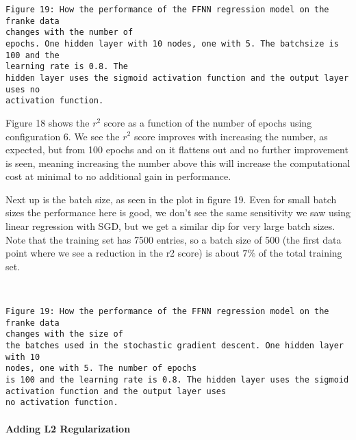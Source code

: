 \documentclass[11pt]{article}
\begin{document}
    \begin{Verbatim}[commandchars=\\\{\}]
Figure 19: How the performance of the FFNN regression model on the franke data
changes with the number of
epochs. One hidden layer with 10 nodes, one with 5. The batchsize is 100 and the
learning rate is 0.8. The
hidden layer uses the sigmoid activation function and the output layer uses no
activation function.
    \end{Verbatim}

    Figure 18 shows the \(r^2\) score as a function of the number of epochs
using configuration 6. We see the \(r^2\) score improves with increasing
the number, as expected, but from 100 epochs and on it flattens out and
no further improvement is seen, meaning increasing the number above this
will increase the computational cost at minimal to no additional gain in
performance.

Next up is the batch size, as seen in the plot in figure 19. Even for
small batch sizes the performance here is good, we don't see the same
sensitivity we saw using linear regression with SGD, but we get a
similar dip for very large batch sizes. Note that the training set has
7500 entries, so a batch size of 500 (the first data point where we see a
reduction in the r2 score) is about \(7\%\) of the total training set.

    \begin{center}
    \end{center}
    { \hspace*{\fill} \\}
    
    \begin{Verbatim}[commandchars=\\\{\}]
Figure 19: How the performance of the FFNN regression model on the franke data
changes with the size of
the batches used in the stochastic gradient descent. One hidden layer with 10
nodes, one with 5. The number of epochs
is 100 and the learning rate is 0.8. The hidden layer uses the sigmoid
activation function and the output layer uses
no activation function.
    \end{Verbatim}

    \hypertarget{adding-l2-regularization}{%
\paragraph{Adding L2 Regularization}\label{adding-l2-regularization}}
\end{document}
